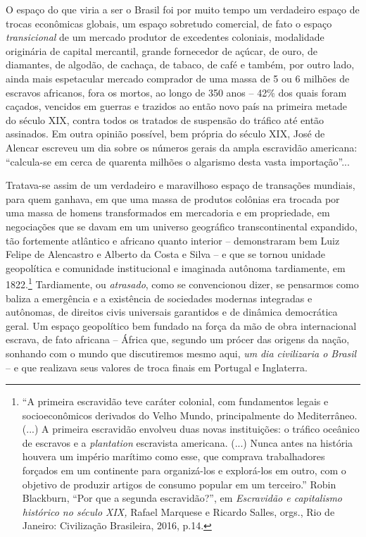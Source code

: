O espaço do que viria a ser o Brasil foi por muito tempo um verdadeiro
espaço de trocas econômicas globais, um espaço sobretudo comercial, de
fato o espaço \emph{transicional} de um mercado produtor de excedentes
coloniais, modalidade originária de capital mercantil, grande fornecedor
de açúcar, de ouro, de diamantes, de algodão, de cachaça, de tabaco, de
café e também, por outro lado, ainda mais espetacular mercado comprador
de uma massa de 5 ou 6 milhões de escravos africanos, fora os mortos, ao
longo de 350 anos -- 42\% dos quais foram caçados, vencidos em guerras e
trazidos ao então novo país na primeira metade do século XIX, contra
todos os tratados de suspensão do tráfico até então assinados. Em outra
opinião possível, bem própria do século XIX, José de Alencar escreveu um
dia sobre os números gerais da ampla escravidão americana: ``calcula-se
em cerca de quarenta milhões o algarismo desta vasta importação''...

Tratava-se assim de um verdadeiro e maravilhoso espaço de transações
mundiais, para quem ganhava, em que uma massa de produtos colônias era
trocada por uma massa de homens transformados em mercadoria e em
propriedade, em negociações que se davam em um universo geográfico
transcontinental expandido, tão fortemente atlântico e africano quanto
interior -- demonstraram bem Luiz Felipe de Alencastro e Alberto da
Costa e Silva -- e que se tornou unidade geopolítica e comunidade
institucional e imaginada autônoma tardiamente, em 1822.\footnote{``A
  primeira escravidão teve caráter colonial, com fundamentos legais e
  socioeconômicos derivados do Velho Mundo, principalmente do
  Mediterrâneo. (...) A primeira escravidão envolveu duas novas
  instituições: o tráfico oceânico de escravos e a \emph{plantation}
  escravista americana. (...) Nunca antes na história houvera um império
  marítimo como esse, que comprava trabalhadores forçados em um
  continente para organizá-los e explorá-los em outro, com o objetivo de
  produzir artigos de consumo popular em um terceiro.'' Robin Blackburn,
  ``Por que a segunda escravidão?'', em \emph{Escravidão e capitalismo
  histórico no século XIX,} Rafael Marquese e Ricardo Salles, orgs., Rio
  de Janeiro: Civilização Brasileira, 2016, p.14.} Tardiamente, ou
\emph{atrasado}, como se convencionou dizer, se pensarmos como baliza a
emergência e a existência de sociedades modernas integradas e autônomas,
de direitos civis universais garantidos e de dinâmica democrática geral.
Um espaço geopolítico bem fundado na força da mão de obra internacional
escrava, de fato africana -- África que, segundo um prócer das origens
da nação, sonhando com o mundo que discutiremos mesmo aqui, \emph{um}
\emph{dia civilizaria o Brasil} -- e que realizava seus valores de troca
finais em Portugal e Inglaterra.


